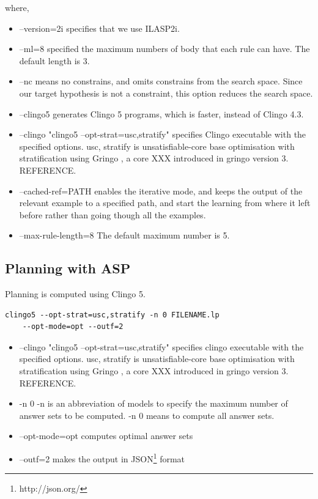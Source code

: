 where,
\begin{itemize}
\item \textsf{--version=2i} specifies that we use ILASP2i.
\item \textsf{--ml=8} specified the maximum numbers of body that each rule can have. The default length is 3.
\item \textsf{--nc} means no constrains, and omits constrains from the search space. Since our target hypothesis is not a constraint, this option reduces the search space.
\item \textsf{--clingo5} generates Clingo 5 programs, which is faster, instead of Clingo 4.3.
\item \textsf{--clingo "clingo5 --opt-strat=usc,stratify"} specifies Clingo executable with the specified options. 
\textsf{usc, stratify} is unsatisfiable-core base optimisation with stratification using Gringo \cite{gringo}, a core XXX introduced in gringo version 3. REFERENCE.
\item \textsf{--cached-ref=PATH} enables the iterative mode, and keeps the output of the relevant example to a specified path, and start the learning from where it left before rather than going though all the examples.
\item \textsf{--max-rule-length=8} The default maximum number is 5.
\end{itemize}

\subsection{Planning with ASP}
Planning is computed using Clingo 5.

\begin{lstlisting}[]
    clingo5 --opt-strat=usc,stratify -n 0 FILENAME.lp
    --opt-mode=opt --outf=2
\end{lstlisting}

\begin{itemize}
\item \textsf{--clingo "clingo5 --opt-strat=usc,stratify"} specifies clingo executable with the specified options. 
\textsf{usc, stratify} is unsatisfiable-core base optimisation with stratification using Gringo \cite{gringo}, a core XXX introduced in gringo version 3. REFERENCE.
\item \textsf{-n 0} -n is an abbreviation of \textsf{models} to specify the maximum number of answer sets to be computed. \textsf{-n 0} means to compute all answer sets.
\item \textsf{--opt-mode=opt} computes optimal answer sets
\item \textsf{--outf=2} makes the output in JSON\footnote{http://json.org/} format
\end{itemize}

